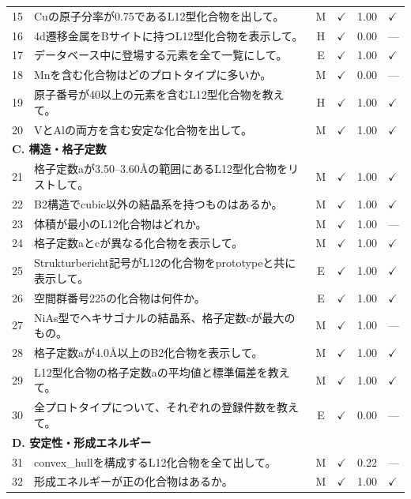 \documentclass[5p,twocolumn]{elsarticle}
\begin{document}
\begin{longtable}{clcccl}
    15 & Cuの原子分率が0.75であるL12型化合物を出して。 & M & $\checkmark$ & 1.00 & $\checkmark$ \\
    16 & 4d遷移金属をBサイトに持つL12型化合物を表示して。 & H & $\checkmark$ & 0.00 & ---\\
    17 & データベース中に登場する元素を全て一覧にして。 & E & $\checkmark$ & 1.00 & $\checkmark$ \\
    18 & Mnを含む化合物はどのプロトタイプに多いか。 & M & $\checkmark$ & 0.00 & --- \\
    19 & 原子番号が40以上の元素を含むL12型化合物を教えて。 & H & $\checkmark$ & 1.00 & $\checkmark$ \\
    20 & VとAlの両方を含む安定な化合物を出して。 & M & $\checkmark$ & 1.00 & $\checkmark$ \\
    \midrule
    \multicolumn{6}{l}{\textbf{C. 構造・格子定数}} \\
    \midrule
    21 & 格子定数aが3.50--3.60\AA の範囲にあるL12型化合物をリストして。 & M & $\checkmark$ & 1.00 & $\checkmark$ \\
    22 & B2構造でcubic以外の結晶系を持つものはあるか。 & M & $\checkmark$ & 1.00 & $\checkmark$ \\
    23 & 体積が最小のL12化合物はどれか。 & M & $\checkmark$ & 1.00 & ---\\
    24 & 格子定数aとcが異なる化合物を表示して。 & M & $\checkmark$ & 1.00 & $\checkmark$ \\
    25 & Strukturbericht記号がL12の化合物をprototypeと共に表示して。 & E & $\checkmark$ & 1.00 & $\checkmark$ \\
    26 & 空間群番号225の化合物は何件か。 & E & $\checkmark$ & 1.00 & $\checkmark$\\
    27 & NiAs型でヘキサゴナルの結晶系、格子定数cが最大のもの。 & M & $\checkmark$ & 1.00 & ---\\
    28 & 格子定数aが4.0\AA 以上のB2化合物を表示して。 & M & $\checkmark$ & 1.00 & $\checkmark$ \\
    29 & L12型化合物の格子定数aの平均値と標準偏差を教えて。 & M & $\checkmark$ & 1.00 & $\checkmark$\\
    30 & 全プロトタイプについて、それぞれの登録件数を教えて。 & E & $\checkmark$ & 0.00 & ---\\
    \midrule
    \multicolumn{6}{l}{\textbf{D. 安定性・形成エネルギー}} \\
    \midrule
    31 & convex\_hullを構成するL12化合物を全て出して。 & M & $\checkmark$ & 0.22 & ---\\
    32 & 形成エネルギーが正の化合物はあるか。 & M & $\checkmark$ & 1.00 & $\checkmark$ \\

\end{longtable}
\end{document}
